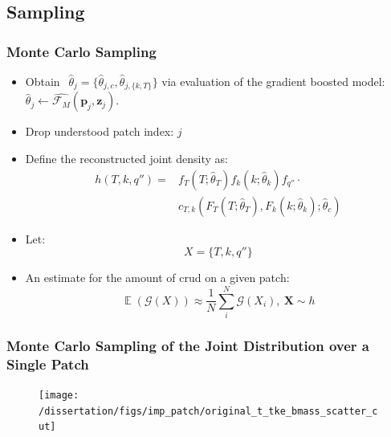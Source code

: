 \documentclass[t, pdftex]{beamer}
\DeclareMathOperator*{\E}{\mathbb{E}}
\begin{document}
\subsection*{Sampling}
\begin{frame}
\frametitle{Monte Carlo Sampling}
\vspace{-16pt}
\begin{itemize}
    \item Obtain $\ \ \hat \theta_j = \{\hat \theta_{j,c}, \hat \theta_{j,\{k, T\}} \}$ via evaluation of the gradient boosted model: $\hat \theta_j \leftarrow \hat{\mathcal F_M}(\mathbf p_j, \mathbf z_j)$.
    \item Drop understood patch index: $j$ 
    \item Define the reconstructed joint density as:
\begin{align}
h(T, k, q'') = & f_T(T;\hat \theta_T) f_k(k;\hat \theta_k) f_{q''} \cdot \nonumber \\
& c_{T,k}(F_T(T;\hat \theta_{T}),F_k(k;\hat \theta_{k});\hat \theta_c) \nonumber
\label{eq:joint_t_tke_q}
\end{align} 

\item Let:
\[ X=\{T, k, q''\} \]

\item An estimate for the amount of crud on a given patch:
\begin{equation}
\E(\mathcal G(X)) \approx \frac{1}{N} \sum_i^N \mathcal G(X_i), \ \mathbf{X} \sim {h} \nonumber
\label{eq:mc_expected_crud}
\end{equation}
\end{itemize}
\end{frame}

\begin{frame}
\frametitle{\small Monte Carlo Sampling of the Joint Distribution over a Single Patch}
\vspace{-19pt}
\begin{figure}[!htbp]
    \centering
    \texttt{[image: /dissertation/figs/imp\_patch/original\_t\_tke\_bmass\_scatter\_cut]}
    \label{model_overview}
\end{figure}
\end{frame}
\end{document}
